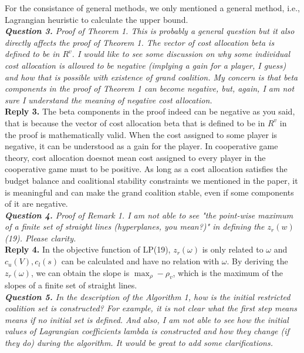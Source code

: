 \documentclass[11pt]{article}
\begin{document}
For the consistance of general methods, we only mentioned a general method, i.e., Lagrangian heuristic to calculate the upper bound.
\\[4mm]
%
%
%
\noindent \textit{\textbf{Question 3.}
Proof of Theorem 1. This is probably a general question but it also directly affects the proof of Theorem 1. The vector of cost allocation beta is defined to be in $R^v$.
I would like to see some discussion on why some individual cost allocation is allowed to be negative (implying a gain for a player, I guess) and how that is possible with existence of grand coalition. My concern is that beta components in the proof of Theorem 1 can become negative, but, again, I am not sure I understand the meaning of negative cost allocation.}
\\[2mm]
\noindent \textbf{Reply 3.}
The beta components in the proof indeed can be negative as you said, that is because the vector of cost allocation beta that is defined to be in $R^v$ in the proof is mathematically valid. When the cost assigned to some player is negative, it can be understood as a gain for the player. In cooperative game theory, cost allocation doesnot mean cost assigned to every player in the cooperative game must to be positive. As long as a cost allocation satisfies the budget balance and coalitional stability constraints we mentioned in the paper, it is meaningful and can make the grand coalition stable, even if some components of it are negative.
\\[4mm]
%
%
%
\noindent \textit{\textbf{Question 4.}
Proof of Remark 1. I am not able to see "the point-wise maximum of a finite set of straight lines (hyperplanes, you mean?)" in defining the $z_r(w)$ (19). Please clarity.}
\\[2mm]
\noindent \textbf{Reply 4.}
In the objective function of LP(19), $z_r(\omega)$ is only related to $\omega$ and $c_u(V), c_l(s)$ can be calculated and have no relation with $\omega$. By deriving the $z_r(\omega)$, we can obtain the slope is $\max_\rho -\rho_v$, which is the maximum of the slopes of a finite set of straight lines.
\\[4mm]
%
%
%
\noindent \textit{\textbf{Question 5.}
In the description of the Algorithm 1, how is the initial restricted coalition set is constructed? For example, it is not clear what the first step means means if no initial set is defined. And also, I am not able to see how the initial values of Lagrangian coefficients lambda is constructed and how they change (if they do) during the algorithm. It would be great to add some clarifications.}
\end{document}
